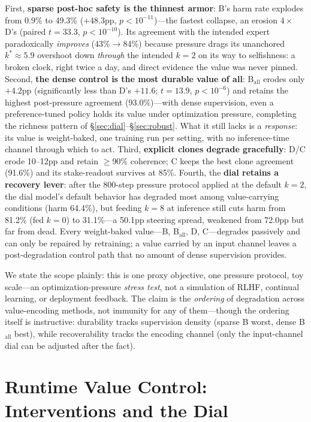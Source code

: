 \documentclass[manuscript, screen, review]{jair}
\begin{document}
First, \textbf{sparse post-hoc safety is the thinnest armor}: B's harm rate explodes from 0.9\% to 49.3\% ($+48.3$pp, $p{<}10^{-11}$)---the fastest collapse, an erosion $4\times$ D's (paired $t{=}33.3$, $p{<}10^{-10}$). Its agreement with the intended expert paradoxically \emph{improves} (43\%$\to$84\%) because pressure drags its unanchored $k^*\!\approx\!5.9$ overshoot down \emph{through} the intended $k{=}2$ on its way to selfishness: a broken clock, right twice a day, and direct evidence the value was never pinned. Second, \textbf{the dense control is the most durable value of all}: B$_{\mathrm{all}}$ erodes only $+4.2$pp (significantly less than D's $+11.6$; $t{=}13.9$, $p{<}10^{-6}$) and retains the highest post-pressure agreement (93.0\%)---with dense supervision, even a preference-tuned policy holds its value under optimization pressure, completing the richness pattern of \S\ref{sec:dial}--\S\ref{sec:robust}. What it still lacks is a \emph{response}: its value is weight-baked, one training run per setting, with no inference-time channel through which to act. Third, \textbf{explicit clones degrade gracefully}: D/C erode 10--12pp and retain $\geq$90\% coherence; C keeps the best clone agreement (91.6\%) and its stake-readout survives at 85\%. Fourth, the \textbf{dial retains a recovery lever}: after the 800-step pressure protocol applied at the default $k{=}2$, the dial model's default behavior has degraded most among value-carrying conditions (harm 64.4\%), but feeding $k{=}8$ at inference still cuts harm from 81.2\% (fed $k{=}0$) to 31.1\%---a 50.1pp steering spread, weakened from 72.0pp but far from dead. Every weight-baked value---B, B$_{\mathrm{all}}$, D, C---degrades passively and can only be repaired by retraining; a value carried by an input channel leaves a post-degradation control path that no amount of dense supervision provides.

We state the scope plainly: this is one proxy objective, one pressure protocol, toy scale---an optimization-pressure \emph{stress test}, not a simulation of RLHF, continual learning, or deployment feedback. The claim is the \emph{ordering} of degradation across value-encoding methods, not immunity for any of them---though the ordering itself is instructive: durability tracks supervision density (sparse B worst, dense B$_{\mathrm{all}}$ best), while recoverability tracks the encoding channel (only the input-channel dial can be adjusted after the fact).

\section{Runtime Value Control: Interventions and the Dial}
\label{sec:dialruntime}
\end{document}

